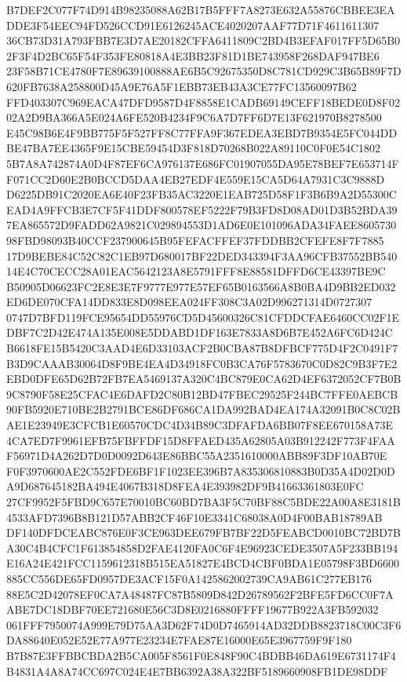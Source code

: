 \documentclass[UTF8,fontset=fandol,zihao=-4,a4paper]{ctexart}
\begin{document}
{{B7DEF2C077F74D914B98235088A62B17B5FFF7A8273E632A55876CBBEE3EADDE3F54EEC94FD526CCD91E6126245ACE4020207AAF77D71F4611611307
36CB73D31A793FBB7E3D7AE20182CFFA6411809C2BD4B3EFAF017FF5D65B02F3F4D2BC65F54F353FE80818A4E3BB23F81D1BE743958F268DAF947BE6
23F58B71CE4780F7E89639100888AE6B5C92675350D8C781CD929C3B65B89F7D620FB7638A258800D45A9E76A5F1EBB73EB43A3CE77FC13560097B62
FFD403307C969EACA47DFD9587D4F8858E1CADB69149CEFF18BEDE0D8F0202A2D9BA366A5E024A6FE520B4234F9C6A7D7FF6D7E13F621970B8278500
E45C98B6E4F9BB775F5F527FF8C77FFA9F367EDEA3EBD7B9354E5FC044DDBE47BA7EE4365F9E15CBE59454D3F818D70268B022A89110C0F0E54C1802
5B7A8A742874A0D4F87EF6CA976137E686FC01907055DA95E78BEF7E653714FF071CC2D60E2B0BCCD5DAA4EB27EDF4E559E15CA5D64A7931C3C9888D
D6225DB91C2020EA6E40F23FB35AC3220E1EAB725D58F1F3B6B9A2D55300CEAD4A9FFCB3E7CF5F41DDF800578EF5222F79B3FD8D08AD01D3B52BDA39
7EA865572D9FADD62A9821C029894553D1AD6E0E101096ADA34FAEE860573098FBD98093B40CCF237900645B95FEFACFFEF37FDDBB2CFEFE8F7F7885
17D9BEBE84C52C82C1EB97D680017BF22DED343394F3AA96CFB37552BB54014E4C70CECC28A01EAC5642123A8E5791FFF8E88581DFFD6CE43397BE9C
B50905D06623FC2E8E3E7F9777E977E57EF65B0163566A8B0BA4D9BB2ED032ED6DE070CFA14DD833E8D098EEA024FF308C3A02D996271314D0727307
0747D7BFD119FCE95654DD55976CD5D45600326C81CFDDCFAE6460CC02F1EDBF7C2D42E474A135E008E5DDABD1DF163E7833A8D6B7E452A6FC6D424C
B6618FE15B5420C3AAD4E6D33103ACF2B0CBA87B8DFBCF775D4F2C0491F7B3D9CAAAB30064D8F9BE4EA4D34918FC0B3CA76F5783670C0D82C9B3F7E2
EBD0DFE65D62B72FB7EA5469137A320C4BC879E0CA62D4EF6372052CF7B0B9C8790F58E25CFAC4E6DAFD2C80B12BD47FBEC29525F244BC7FFE0AEBCB
90FB5920E710BE2B2791BCE86DF686CA1DA992BAD4EA174A32091B0C8C02BAE1E23949E3CFCB1E60570CDC4D34B89C3DFAFDA6BB07F8EE670158A73E
4CA7ED7F9961EFB75FBFFDF15D8FFAED435A62805A03B912242F773F4FAAF56971D4A262D7D0D0092D643E86BBC55A2351610000ABB89F3DF10AB70E
F0F3970600AE2C552FDE6BF1F1023EE396B7A835306810883B0D35A4D02D0DA9D687645182BA494E4067B318D8FEA4E393982DF9B41663361803E0FC
27CF9952F5FBD9C657E70010BC60BD7BA3F5C70BF88C5BDE22A00A8E3181B4533AFD7396B8B121D57ABB2CF46F10E3341C68038A0D4F00BAB18789AB
DF140DFDCEABC876E0F3CE963DEE679FB7BF22D5FEABCD0010BC72BD7BA30C4B4CFC1F613854858D2FAE4120FA0C6F4E96923CEDE3507A5F233BB194
E16A24E421FCC1159612318B515EA51827E4BCD4CBF0BDA1E05798F3BD6600885CC556DE65FD0957DE3ACF15F0A1425862002739CA9AB61C277EB176
88E5C2D42078EF0CA7A48487FC87B5809D842D26789562F2BFE5FD6CC0F7AABE7DC18DBF70EE721680E56C3D8E0216880FFFF19677B922A3FB592032
061FFF7950074A999E79D75AA3D62F74D0D7465914AD32DDB8823718C00C3F6DA88640E052E52E77A977E23234E7FAE87E16000E65E3967759F9F180
B7B87E3FFBBCBDA2B5CA005F8561F0E848F90C4BDBB46DA619E6731174F4B4831A4A8A74CC697C024E4E7BB6392A38A322BF5189660908FB1DE98DDF
}}
\end{document}
